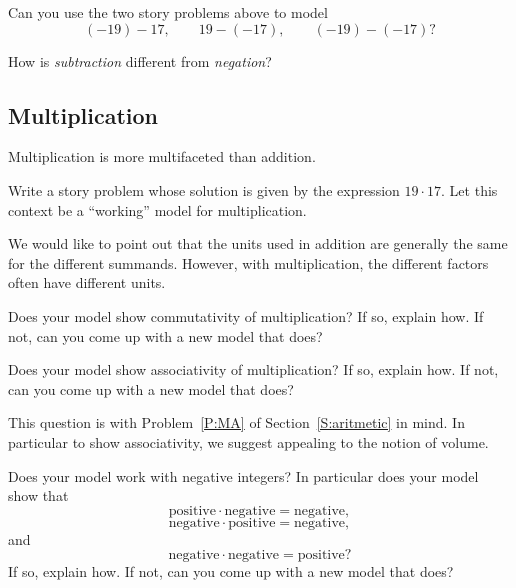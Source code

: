 \begin{question}
Can you use the two story problems above to model
\[
(-19)-17, \qquad  19 - (-17), \qquad (-19) - (-17)?
\]
\end{question}
\QM

\begin{question}
How is \emph{subtraction} different from \emph{negation}?  
\end{question}
\QM

\subsection{Multiplication}
Multiplication is more multifaceted than addition. 

\begin{question}
Write a story problem whose solution is given by the expression
$19\cdot 17$. Let this context be a ``working'' model for multiplication. 
\end{question}
\QM

\begin{teachingnote}
We would like to point out that the units used in addition are generally
the same for the different summands. However, with multiplication, the
different factors often have different units.
\end{teachingnote}

\begin{question}
Does your model show commutativity of multiplication? If so, explain
how. If not, can you come up with a new model that does?
\end{question}
\QM

\begin{question}
Does your model show associativity of multiplication? If so, explain
how. If not, can you come up with a new model that does?
\end{question}
\QM

\begin{teachingnote}
This question is with Problem~\ref{P:MA} of
Section~\ref{S:aritmetic} in mind. In particular to show
associativity, we suggest appealing to the notion of volume.
\end{teachingnote}


\begin{question}
Does your model work with negative integers? In particular does your
model show that
\[
\text{positive}\cdot \text{negative} = \text{negative},
\]
\[
\text{negative}\cdot \text{positive} = \text{negative},
\]
and 
\[
\text{negative}\cdot \text{negative} = \text{positive}?
\]
If so, explain how. If not, can you come up with a new model that
does?
\end{question}
\QM

